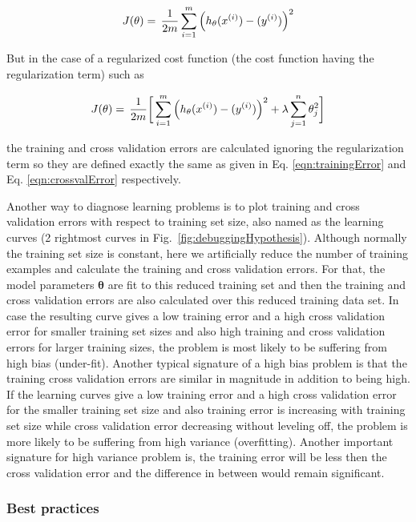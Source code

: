 \begin{equation}{\label{eqn:costFuncLinearRegression}}
J(\theta)
=\,
\frac{1}{2m} \sum\limits_{i=1}^{m} \Big(h_\theta(x^{(i)}) - (y^{(i)})\Big)^2  
\end{equation} 

But in the case of a regularized cost function (the cost function having the regularization term) such as

\begin{equation}{\label{eqn:costFuncRegularized}}
J(\theta)
=\,
\frac{1}{2m} \bigg[ \sum\limits_{i=1}^{m} \Big(h_\theta(x^{(i)}) - (y^{(i)})\Big)^2 +\lambda \sum\limits_{j=1}^{n} \theta_j^2 \bigg] 
\end{equation} 

the training and cross validation errors are calculated ignoring the regularization term so they are defined exactly the same as given in Eq. \ref{eqn:trainingError} and Eq. \ref{eqn:crossvalError} respectively.

Another way to diagnose learning problems is to plot training and cross validation errors with respect to training set size, also named as the learning curves (2 rightmost curves in Fig.~\ref{fig:debuggingHypothesis}). 
Although normally the training set size is constant, here we artificially reduce the number of training examples and calculate the training and cross validation errors. 
For that, the model parameters $\bm{\theta}$ are fit to this reduced training set and then the training and cross validation errors are also calculated over this reduced training data set. 
In case the resulting curve gives a low training error and a high cross validation error for smaller training set sizes and also high training and cross validation errors for larger training sizes, the problem is most likely to be suffering from high bias (under-fit). 
Another typical signature of a high bias problem is that the training cross validation errors are similar in magnitude in addition to being high. 
If the learning curves give a low training error and a high cross validation error for the smaller training set size and also training error is increasing with training set size while cross validation error decreasing without leveling off, the problem is more likely to be suffering from high variance (overfitting). 
Another important signature for high variance problem is, the training error will be less then the cross validation error and the difference in between would remain significant. 

\subsubsection{Best practices}

